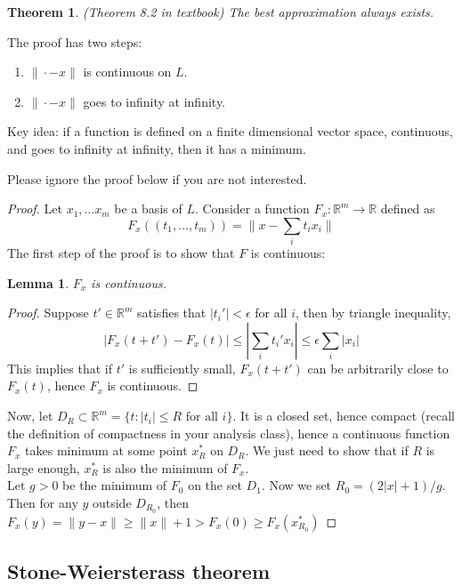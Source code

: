 \documentclass[20pt]{article} %
\theoremstyle{break}
\newtheorem{lem}[definition]{Lemma}
\newtheorem{thm}[definition]{Theorem}
\begin{document}
\begin{thm} (Theorem 8.2 in textbook) The best approximation always exists.\end{thm}

The proof has two steps:

\begin{enumerate}
\item $\|\cdot-x\|$ is continuous on $L$.
\item $\|\cdot-x\|$ goes to infinity at infinity.
\end{enumerate}

Key idea: if a function is defined on a finite dimensional vector space, continuous, and goes to infinity at infinity, then it has a minimum.

\newpage

Please ignore the proof below if you are not interested.

\begin{proof}
  Let $x_1, \dots x_m$ be a basis of $L$. Consider a function $F_x: \mathbb{R}^m\rightarrow \mathbb{R}$ defined as
  \[F_x((t_1, \dots, t_m))=\|x-\sum_i t_ix_i\|\]
  The first step of the proof is to show that $F$ is continuous:
  \begin{lem}\label{cont} $F_x$ is continuous.\end{lem}
  \begin{proof}
  Suppose $t'\in\mathbb{R}^m$ satisfies that $|t_i'|<\epsilon$ for all $i$, then by triangle inequality,
  \[|F_x(t+t')-F_x(t)|\leq |\sum_i t_i'x_i|\leq \epsilon\sum_i |x_i|\]
  This implies that if $t'$ is sufficiently small, $F_x(t+t')$ can be arbitrarily close to $F_x(t)$, hence $F_x$ is continuous.
\end{proof}

  \newpage
  
  Now, let $D_R\subset\mathbb{R}^m=\{t:|t_i|\leq R\text{ for all }i\}$. It is a closed set, hence compact (recall the definition of compactness in your analysis class), hence a continuous function $F_x$ takes minimum at some point $x^*_R$ on $D_R$. We just need to show that if $R$ is large enough, $x^*_R$ is also the minimum of $F_x$.\\

  Let $g>0$ be the minimum of $F_0$ on the set $D_1$. Now we set $R_0=(2|x|+1)/g$. Then for any $y$ outside $D_{R_0}$, then $F_x(y)=\|y-x\|\geq \|x\|+1>F_x(0)\geq F_x(x^*_{R_0})$
\end{proof}

\newpage

\subsection{Stone-Weiersterass theorem}
\end{document}
